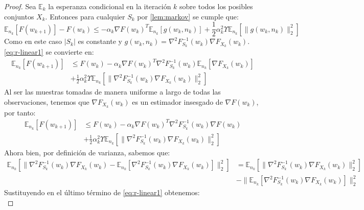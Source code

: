 \documentclass{book}
\theoremstyle{plain}
\theoremstyle{definition}
\theoremstyle{remark}
\begin{document}
\begin{proof}
Sea $\mathbb{E}_k$ la esperanza condicional en la iteración $k$ sobre todos los posibles conjuntos $X_k$. Entonces para cualquier $S_k$ por \ref{lem:markov} se cumple que:
\begin{equation}\label{eq:r-linear1}
        \mathbb{E}_{n_k}[F(w_{k+1})] - F(w_{k}) \leq -\alpha_k\nabla F(w_{k})^T\mathbb{E}_{n_k}[g(w_{k}, n_{k})]+\frac{1}{2}\alpha^2_k\Upsilon\mathbb{E}_{n_k}[\|g(w_{k}, n_{k})\|_2^2]
\end{equation}
Como en este caso $|S_k|$ es constante y $g(w_k,n_k)=\nabla^2F_{S_k}^{-1}(w_k)\nabla F_{X_k}(w_k)$. \ref{eq:r-linear1} se convierte en:
\begin{equation}
    \begin{split}
        \mathbb{E}_{n_k}[F(w_{k+1})] & \leq F(w_{k}) -\alpha_k\nabla F(w_{k})^T\nabla^2F_{S_k}^{-1}(w_k)\mathbb{E}_{n_k}[\nabla F_{X_k}(w_k)]\\ & +\frac{1}{2}\alpha^2_k\Upsilon\mathbb{E}_{n_k}[\|\nabla^2F_{S_k}^{-1}(w_k)\nabla F_{X_k}(w_k)\|_2^2]
    \end{split}
\end{equation}
Al ser las muestras tomadas de manera uniforme a largo de todas las observaciones, tenemos que $\nabla F_{X_k}(w_k)$ es un estimador insesgado de $\nabla F(w_k)$, por tanto:
\begin{equation}\label{eq:r-linear2}
\begin{split}
        \mathbb{E}_{n_k}[F(w_{k+1})] & \leq F(w_{k}) -\alpha_k\nabla F(w_{k})^T\nabla^2F_{S_k}^{-1}(w_k)\nabla F(w_k)\\ & +\frac{1}{2}\alpha^2_k\Upsilon\mathbb{E}_{n_k}[\|\nabla^2F_{S_k}^{-1}(w_k)\nabla F_{X_k}(w_k)\|_2^2]
\end{split}
\end{equation}
Ahora bien, por definición de varianza, sabemos que:
\begin{equation*}
\begin{split}
    \mathbb{E}_{n_k}[\|\nabla^2F_{S_k}^{-1}(w_k)\nabla F_{X_k}(w_k) - \mathbb{E}_{n_k}[\nabla^2F_{S_k}^{-1}(w_k)\nabla F_{X_k}(w_k)]\|_2^2] & = \mathbb{E}_{n_k}[\|\nabla^2F_{S_k}^{-1}(w_k)\nabla F_{X_k}(w_k)\|_2^2] \\ & - \|\mathbb{E}_{n_k}[\nabla^2F_{S_k}^{-1}(w_k)\nabla F_{X_k}(w_k)]\|_2^2
    \end{split}
\end{equation*}
Sustituyendo en el último término de \ref{eq:r-linear1} obtenemos:
\begin{equation}\label{eq:r-linear3}

\end{equation}
\end{proof}
\end{document}
